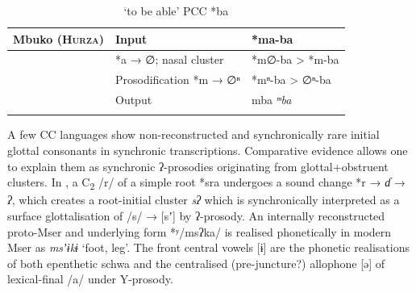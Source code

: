 \documentclass[output=paper]{langscibook}
\begin{document}
\begin{table}
\caption{‘to be able’ PCC *ba}
\label{extab:wolff:16}
\small

\begin{tabular}{lll}
\lsptoprule
 Mbuko (\textsc{Hurza}) & Input                           & *ma-ba \\
  \midrule
                        & *a → ∅;  nasal cluster          & *m∅-ba > *m-ba\\
                        & { Prosodification}  *m → ∅ⁿ     & *mⁿ-ba > ∅ⁿ-ba \\
                        \midrule
                        & Output                          & mba \textit{ᵐba}\\
\midrule
\lspbottomrule
\end{tabular}
\end{table}

A few CC languages show non-reconstructed and synchronically rare initial glottal consonants in synchronic transcriptions. Comparative evidence allows one to explain them as synchronic ʔ-prosodies originating from glottal+obstruent clusters. In , a C\textsubscript{2} /r/ of a simple root *sra undergoes a sound change *r → \textit{ɗ} → \textit{ʔ}, which creates a root-initial cluster \textit{sʔ} which is synchronically interpreted as a surface glottalisation of /s/ → [sʼ] by ʔ-prosody. An internally reconstructed proto-Mser and underlying form *ʸ/msʔka/ is realised phonetically in modern Mser as \textit{msʼɨkɨ} ‘foot, leg’. The front central vowels [ɨ] are the phonetic realisations of both epenthetic schwa and the centralised (pre-juncture?) allophone [ə] of lexical-final /a/ under Y-prosody.
\end{document}
